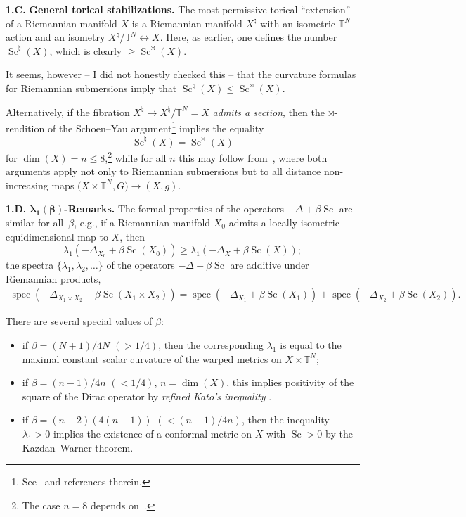 \documentclass[10pt,a4paper]{amsart}
\numberwithin{equation}{section}
\begin{document}
\textbf{1.C.} \textbf{General torical stabilizations.} The most permissive torical ``extension'' of a Riemannian manifold $X$ is a Riemannian
 manifold $X^\natural $ with an isometric $\mathbb T^N$-action and an isometry $X^\natural/\mathbb T^N\leftrightarrow X$. Here,
 as earlier, one defines the number $\operatorname{Sc}^\natural(X)$, which is clearly $ \geq \operatorname{Sc}^\rtimes(X)$.

It seems, however -- I did not honestly checked this -- that the curvature formulas for Riemannian submersions \cite{O'N1966} imply that $\operatorname{Sc}^\natural(X)\leq \operatorname{Sc}^\rtimes(X)$.

 Alternatively, if
 the fibration $X^\natural \to X^\natural/\mathbb T^N=X$ {\it admits a section}, then the $\rtimes$-rendition of the Schoen--Yau argument\footnote{See~\cite{Gr2023} and references therein.} implies
the equality
\[
\operatorname{Sc}^\natural(X)= \operatorname{Sc}^\rtimes(X)
\]
for $\dim(X)=n\leq 8$,\footnote {The case $n=8$ depends on~\cite{Sm2003}.} while for all $n$
this may follow from~\cite{WXY2021}, where both arguments apply not only to Riemannian submersions but to all distance non-increasing maps $\bigl(X\times \mathbb T^N, G\bigr)\to (X,g)$.

\textbf{1.D. $\boldsymbol{\lambda_1(\beta)}$-Remarks.} The formal properties of the operators $-\Delta+ \beta \operatorname{Sc}$ are similar for all~$\beta$, e.g.,
if a Riemannian manifold $X_0$ admits a locally isometric equidimensional map to $X$, then
\[
\lambda_1(-\Delta_{X_0}+\beta \operatorname{Sc}(X_0)) \geq \lambda_1(-\Delta_{X}+\beta \operatorname{Sc}(X));
\]
the spectra $ \{\lambda_1,\lambda_2,\dots\}$ of the operators $-\Delta+ \beta \operatorname{Sc}$ are additive under Riemannian products,
\begin{gather*}
\operatorname{spec}(-\Delta_{X_1\times X_2} + \beta \operatorname{Sc}(X_1\times X_2))=\operatorname{spec}(-\Delta_{X_1} + \beta \operatorname{Sc}(X_1))+ \operatorname{spec}(-\Delta_{ X_2} + \beta \operatorname{Sc}( X_2)).
\end{gather*}

There are several special values of $\beta$:
\begin{itemize}\itemsep=0pt

\item if $\beta=(N+1)/4N$ $(>1/4)$, then the corresponding $\lambda_1$ is equal
to the maximal constant scalar curvature of the warped metrics on $X\times \mathbb T^N$;

\item if $ \beta=(n-1)/4n$ $(<1/4)$, $n=\dim(X)$, this implies positivity of the square of the Dirac operator by {\it refined Kato's inequality} \cite{He2000}.

\item if $\beta=(n-2)(4(n-1))$ $(<(n-1)/4n)$, then the inequality $\lambda_1>0$ implies the existence of a conformal metric on $X$ with $\operatorname{Sc}>0$ by the Kazdan--Warner theorem.
    \end{itemize}
\end{document}
